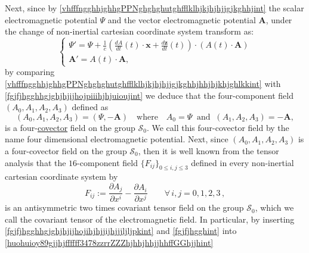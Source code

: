 \documentclass{article}
\theoremstyle{definition}
\theoremstyle{remark}
\renewcommand{\vec}[1]{\mathbf{#1}}
\newcommand{\er}{\eqref}
\newcommand{\er}{\eqref}
\begin{document}
Next, since by
\er{vhfffngghhjghhgPPNghghghutghfflklhjkjhjhjjgjkghhjint} the scalar
electromagnetic potential $\Psi$ and the vector electromagnetic
potential $\vec A$, under the change of non-inertial cartesian
coordinate system transform as:
\begin{equation}\label{vhfffngghhjghhgPPNghghghutghfflklhjkjhjhjjgjkghhjhhjhjkhjghlkkint}
\begin{cases}
\Psi'=
\Psi+\frac{1}{c}\left(\frac{dA}{dt}(t)\cdot\vec x+\frac{d\vec
z}{dt}(t)\right)\cdot\left(A(t)\cdot\vec A\right)
\\
\vec A'=A(t)\cdot \vec A,
\end{cases}
\end{equation}
by comparing
\er{vhfffngghhjghhgPPNghghghutghfflklhjkjhjhjjgjkghhjhhjhjkhjghlkkint}
with \er{fgjfjhgghhgjghjhjijhojpiiihjhjuioujint} we deduce that the
four-component field $(A_0,A_1,A_2,A_3)$ defined as
\begin{equation}\label{fgjfjhgghhgjghjhjijhojihjhjjijhjjjljljpkint}
(A_0,A_1,A_2,A_3)=(\Psi,-\vec A)\quad\text{where}\quad
A_0=\Psi\;\;\text{and}\;\;(A_1,A_2,A_3)=-\vec A,
\end{equation}
is a four-\underline{covector} field on the group $\mathcal{S}_0$.
We call this  four-covector field by the name four dimensional
electromagnetic potential. Next, since $(A_0,A_1,A_2,A_3)$ is a
four-covector field on the group $\mathcal{S}_0$, then it is well
known from the tensor analysis that the $16$-component field
$\{F_{ij}\}_{0\leq i,j\leq 3}$ defined in every non-inertial
cartesian coordinate system by
\begin{equation}\label{huohuioy89gjjhjffffff3478zzrrZZZhjhhjhhjjhhffGGhjjhint}
F_{ij}:=\frac{\partial A_j}{\partial x^i}-\frac{\partial
A_i}{\partial x^j}\quad\quad\forall\, i,j=0,1,2,3\,,
\end{equation}
is an antisymmetric two times covariant tensor field on the group
$\mathcal{S}_0$, which we call the covariant tensor of the
electromagnetic field. In particular, by inserting
\er{fgjfjhgghhgjghjhjijhojihjhjjijhjjjljljpkint} and
\er{fgjfjhgghint} into
\er{huohuioy89gjjhjffffff3478zzrrZZZhjhhjhhjjhhffGGhjjhint}
%
%
%
\begin{comment} we deduce:
\begin{equation}\label{huohuioy89gjjhjffffff3478zzrrZZZhjhhjhhjjhhffGGhjjhiuuiint}
\begin{cases}
F_{00}=0\\ F_{0j}=-F_{j0}=-\frac{1}{c}\frac{\partial(-A_j)}{\partial
t}-\frac{\partial \Psi}{\partial
x^j}\quad\quad\forall\, j=1,2,3\\
F_{jj}=0\quad\quad\forall\, j=1,2,3
\\
F_{ij}=-F_{ji}=\frac{\partial (-A_i)}{\partial x^j}-\frac{\partial
(-A_j)}{\partial x^i}\quad\quad\forall\, i\neq j=1,2,3\,,
\end{cases}
\end{equation}
Thus if as in
\er{MaxVacFull1bjkgjhjhgjgjgkjfhjfdghghligioiuittrPPNint} we denote:
\end{comment}
\end{document}
